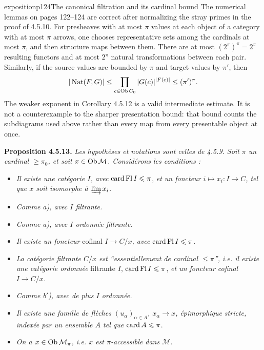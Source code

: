 \begin{dcomment}{exposition}{p124}{The canonical filtration and its cardinal bound}
The numerical lemmas on pages 122--124 are correct after normalizing the stray primes in the proof of 4.5.10. For presheaves with at most $\pi$ values at each object of a category with at most $\pi$ arrows, one chooses representative sets among the cardinals at most $\pi$, and then structure maps between them. There are at most $(2^\pi)^\pi=2^\pi$ resulting functors and at most $2^\pi$ natural transformations between each pair. Similarly, if the source values are bounded by $\pi$ and target values by $\pi'$, then
\[
 |\operatorname{Nat}(F,G)|\leq
 \prod_{c\in\mathrm{Ob}\, C_0}|G(c)|^{|F(c)|}
 \leq(\pi')^\pi.
\]
The weaker exponent in Corollary 4.5.12 is a valid intermediate estimate. It is not a counterexample to the sharper presentation bound: that bound counts the subdiagrams used above rather than every map from every presentable object at once.
\end{dcomment}


\textbf{Proposition 4.5.13.} \textit{Les hypothèses et notations sont celles de 4.5.9. Soit $\pi$ un cardinal $\geqslant \pi_0$, et soit $x \in \mathrm{Ob}\, \mathcal{M}$. Considérons les conditions :}
\begin{itemize}[leftmargin=3em]
\item[\textit{a})] \textit{Il existe une catégorie $I$, avec} $\operatorname{card} \operatorname{Fl} I \leqslant \pi$, \textit{et un foncteur $i \longmapsto x_i : I \longrightarrow C$, tel que $x$ soit isomorphe à $\varinjlim x_i$.}
\item[\textit{a}$'$)] \textit{Comme a), avec $I$ filtrante.}
\item[\textit{a}$''$)] \textit{Comme a), avec $I$ ordonnée filtrante.}
\item[\textit{b})] \textit{Il existe un foncteur} cofinal \textit{$I \longrightarrow C/x$, avec} $\operatorname{card} \operatorname{Fl} I \leqslant \pi$.
\item[\textit{b}$'$)] \textit{La catégorie filtrante $C/x$ est ``essentiellement de cardinal $\leqslant \pi$'', i.e. il existe une catégorie ordonnée} filtrante $I$, $\operatorname{card} \operatorname{Fl} I \leqslant \pi$, \textit{et un foncteur cofinal $I \longrightarrow C/x$.}
\item[\textit{b}$''$)] \textit{Comme b$'$), avec de plus $I$ ordonnée.}
\item[\textit{c})] \textit{Il existe une famille de flèches $(u_\alpha)_{\alpha \in A}$, $x_\alpha \longrightarrow x$, épimorphique stricte, indexée par un ensemble $A$ tel que} $\operatorname{card} A \leqslant \pi$.
\item[\textit{d})] \textit{On a $x \in \mathrm{Ob}\, \mathcal{M}_\pi$, i.e. $x$ est $\pi$-accessible dans $\mathcal{M}$.}
\end{itemize}

